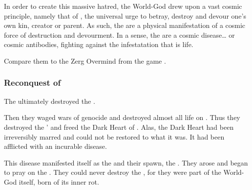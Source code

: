 In order to create this massive hatred, the World-God drew upon a vast cosmic principle, namely that of , the universal urge to betray, destroy and devour one's own kin, creator or parent. 
As such, the \banes{} are a physical manifestation of a cosmic force of destruction and devourment. 
In a sense, the \banes are a cosmic disease\ldots{} or cosmic antibodies, fighting against the infestatation that is life.

Compare them to the Zerg Overmind from the game \cite{VideoGame:Starcraft}. 






\subsubsection{Reconquest of \Erebos}
The \banes ultimately destroyed the \voyagers.

Then they waged wars of genocide and destroyed almost all life on \Erebos. 
Thus they destroyed the \voyagers' \dweomer and freed the Dark Heart of \Erebos. 
Alas, the Dark Heart had been irreversibly marred and could not be restored to what it was.
It had been afflicted with an incurable disease. 

This disease manifested itself as the  and their spawn, the .
They arose and began to pray on the \banes.
They could never destroy the \umbrae, for they were part of the World-God itself, born of its inner rot. 

